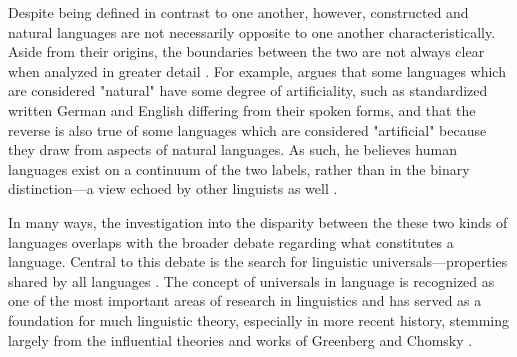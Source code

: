 \documentclass[12pt,a4paper]{article}
\numberwithin{figure}{section}
\numberwithin{table}{section}
\numberwithin{definition}{section}
\begin{document}
Despite being defined in contrast to one another, however, constructed and natural languages are not necessarily opposite to one another characteristically. Aside from their origins, the boundaries between the two are not always clear when analyzed in greater detail \parencite{goodall2022article}. For example, \textcite{Schubert1989inbook} argues that some languages which are considered "natural" have some degree of artificiality, such as standardized written German and English differing from their spoken forms, and that the reverse is also true of some languages which are considered "artificial" because they draw from aspects of natural languages. As such, he believes human languages exist on a continuum of the two labels, rather than in the binary distinction---a view echoed by other linguists as well \parencite{Novikov2022article}. 


In many ways, the investigation into the disparity between the these two kinds of languages overlaps with the broader debate regarding what constitutes a language. Central to this debate is the search for linguistic universals---properties shared by all languages \parencite{Mairal2006book}. The concept of universals in language is recognized as one of the most important areas of research in linguistics \parencite{Christiansen2009book} and has served as a foundation for much linguistic theory, especially in more recent history, stemming largely from the influential theories and works of Greenberg \parencite{Greenberg1970book} and Chomsky \parencite{Chomsky1957book,Cook2007book}. 
\end{document}

